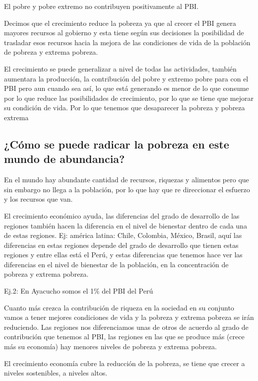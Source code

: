 \documentclass[
  a4paper,
]{article}
\begin{document}
El pobre y pobre extremo no contribuyen positivamente al PBI.

Decimos que el crecimiento reduce la pobreza ya que al crecer el PBI
genera mayores recursos al gobierno y esta tiene según sus decisiones la
posibilidad de trasladar esos recursos hacia la mejora de las
condiciones de vida de la población de pobreza y extrema pobreza.

El crecimiento se puede generalizar a nivel de todas las actividades,
también aumentara la producción, la contribución del pobre y extremo
pobre para con el PBI pero aun cuando sea así, lo que está generando es
menor de lo que consume por lo que reduce las posibilidades de
crecimiento, por lo que se tiene que mejorar su condición de vida. Por
lo que tenemos que desaparecer la pobreza y pobreza extrema

\hypertarget{cuxf3mo-se-puede-radicar-la-pobreza-en-este-mundo-de-abundancia}{%
\subsection{¿Cómo se puede radicar la pobreza en este mundo de
abundancia?}\label{cuxf3mo-se-puede-radicar-la-pobreza-en-este-mundo-de-abundancia}}

En el mundo hay abundante cantidad de recursos, riquezas y alimentos
pero que sin embargo no llega a la población, por lo que hay que re
direccionar el esfuerzo y los recursos que van.

El crecimiento económico ayuda, las diferencias del grado de desarrollo
de las regiones también hacen la diferencia en el nivel de bienestar
dentro de cada una de estas regiones. Ej: américa latina: Chile,
Colombia, México, Brasil, aquí las diferencias en estas regiones depende
del grado de desarrollo que tienen estas regiones y entre ellas está el
Perú, y estas diferencias que tenemos hace ver las diferencias en el
nivel de bienestar de la población, en la concentración de pobreza y
extrema pobreza.

Ej.2: En Ayacucho somos el 1\% del PBI del Perú

Cuanto más crezca la contribución de riqueza en la sociedad en su
conjunto vamos a tener mejores condiciones de vida y la pobreza y
extrema pobreza se irán reduciendo. Las regiones nos diferenciamos unas
de otros de acuerdo al grado de contribución que tenemos al PBI, las
regiones en las que se produce más (crece más su economía) hay menores
niveles de pobreza y extrema pobreza.

El crecimiento economía cubre la reducción de la pobreza, se tiene que
crecer a niveles sostenibles, a niveles altos.
\end{document}
